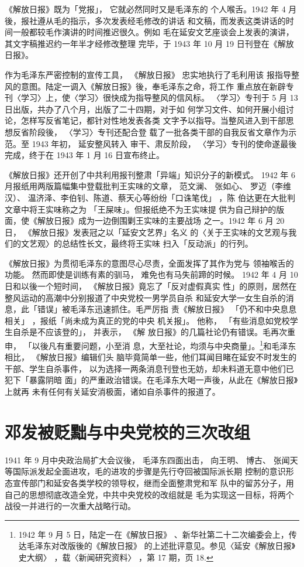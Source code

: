 《解放日报》既为「党报」，
它就必然同时又是毛泽东的
个人喉舌。1942 年 4 月後，报社遵从毛的指示，多次发表经毛修改的讲话
和文稿，而发表这类讲话的时间一般都较毛作演讲的时间推迟很久。例如
毛在延安文艺座谈会上发表的演讲，其文字稿推迟约一年半才经修改整理
完毕，于 1943 年 10 月 19 日刊登在《解放日报》。

作为毛泽东严密控制的宣传工具，
《解放日报》
忠实地执行了毛利用该
报指导整风的意图。陆定一调入《解放日报》後，奉毛泽东之命，将工作
重点放在新辟专刊〈学习〉上，使〈学习〉很快成为指导整风的信风标。
〈学习〉专刊于 5 月 13 日出版，共办了八个月，出版了二十四期，对于如
何学习文件、如何开展小组讨论，怎样写反省笔记，都针对性地发表各类
文字予以指导。当整风进入到干部思想反省阶段後，
〈学习〉专刊还配合登
载了一批各类干部的自我反省文章作为示范。至 1943 年初，
延安整风转入
审干、肃反阶段，
〈学习〉专刊的使命遂最後完成，终于在 1943 年 1 月 16
日宣布终止。

《解放日报》还开创了中共利用报刊整肃「异端」知识分子的新模式。
1942 年 6 月报纸用两版篇幅集中登载批判王实味的文章，
范文澜、
张如心、
罗迈（李维汉）、
温济泽、李伯钊、陈道、蔡天心等纷纷「口诛笔伐」
，陈
伯达更在大批判文章中将王实味称之为
「王屎味」。但报纸绝不为王实味提
供为自己辩护的版面，使《解放日报》成为一边倒围剿王实味的主要战场
之一。1942 年 6 月 20 日，
《解放日报》发表冠之以「延安文艺界」名义
的〈关于王实味的文艺观与我们的文艺观〉的总结性长文，最终将王实味
扫入「反动派」的行列。

《解放日报》为贯彻毛泽东的意图尽心尽责，全面发挥了其作为党与
领袖喉舌的功能。
然而即使是训练有素的驯马，
难免也有马失前蹄的时候。
1942 年 4 月 10 日和以後一个短时间，
《解放日报》竟忘了「反对虚假真实
性」的原则，居然在整风运动的高潮中分别报道了中央党校一男学员自杀
和延安大学一女生自杀的消息，此「错误」被毛泽东迅速抓住。毛严厉指
责《解放日报》
「仍不和中央息息相关」
，报纸「尚未成为真正的党的中央
机关报」。
他称，
「有些消息如党校学生自杀是不应该登的」，
并表示，
《解
放日报》的几篇社论仍有错误。毛再次重申，
「以後凡有重要问题，小至消
息，大至社论，均须与中央商量」。\footnote{ 1942 年 9 月 5 日，陆定一在《解放日报》
、新华社第二十二次编委会上，传达毛泽东对改版後的《解放日报》
的上述批评意见。参见〈延安《解放日报》史大纲〉
，载〈新闻研究资料〉
，第 17 期，页 18.}和毛泽东相比，
《解放日报》编辑们头
脑毕竟简单一些，他们耳闻目睹在延安不时发生的干部、学生自杀事件，
以为选择一两条消息刊登也无妨，却未料道无意中他们已犯下「暴露阴暗
面」的严重政治错误。在毛泽东大喝一声後，从此在《解放日报》上就再
未有任何有关延安消极面，诸如自杀事件的报道了。

\section{邓发被贬黜与中央党校的三次改组}
1941 年 9 月中央政治局扩大会议後，
毛泽东四面出击，
向王明、
博古、
张闻天等国际派发起全面进攻，毛的进攻的步骤是先行夺回被国际派长期
控制的意识形态宣传部门和延安各类学校的领导权，继而全面整肃党和军
队中的留苏分子，用自己的思想彻底改造全党，中共中央党校的改组就是
毛为实现这一目标，将两个战役一并进行的一次重大战略行动。

